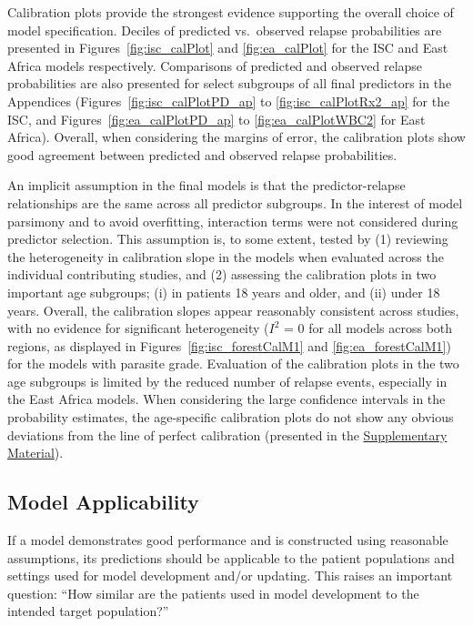 Calibration plots provide the strongest evidence supporting the overall choice of model specification. Deciles of predicted vs.\ observed relapse probabilities are presented in Figures~\ref{fig:isc_calPlot} and \ref{fig:ea_calPlot} for the ISC and East Africa models respectively. Comparisons of predicted and observed relapse probabilities are also presented for select subgroups of all final predictors in the Appendices (Figures~\ref{fig:isc_calPlotPD_ap} to \ref{fig:isc_calPlotRx2_ap} for the ISC, and Figures~\ref{fig:ea_calPlotPD_ap} to \ref{fig:ea_calPlotWBC2} for East Africa). Overall, when considering the margins of error, the calibration plots show good agreement between predicted and observed relapse probabilities.

An implicit assumption in the final models is that the predictor-relapse relationships are the same across all predictor subgroups. In the interest of model parsimony and to avoid overfitting, interaction terms were not considered during predictor selection. This assumption is, to some extent, tested by (1) reviewing the heterogeneity in calibration slope in the models when evaluated across the individual contributing studies, and (2) assessing the calibration plots in two important age subgroups; (i) in patients 18 years and older, and (ii) under 18 years. Overall, the calibration slopes appear reasonably consistent across studies, with no evidence for significant heterogeneity ($I^2$ = 0 for all models across both regions, as displayed in Figures~\ref{fig:isc_forestCalM1} and \ref{fig:ea_forestCalM1}) for the models with parasite grade. Evaluation of the calibration plots in the two age subgroups is limited by the reduced number of relapse events, especially in the East Africa models. When considering the large confidence intervals in the probability estimates, the age-specific calibration plots do not show any obvious deviations from the line of perfect calibration (presented in the \href{https://github.com/jpwil/dphil}{Supplementary Material}).

\subsection{Model Applicability\label{sec:applicability}}

If a model demonstrates good performance and is constructed using reasonable assumptions, its predictions should be applicable to the patient populations and settings used for model development and/or updating\cite{moons2025}. This raises an important question: ``How similar are the patients used in model development to the intended target population?''


